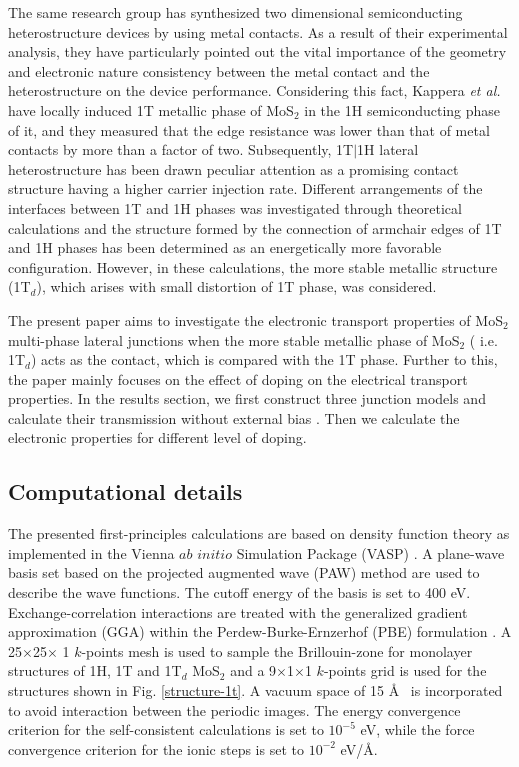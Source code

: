 The same research group has synthesized two dimensional semiconducting heterostructure devices\cite{Huang2014,Zhang2015} by using metal contacts. As a result of their experimental analysis, they have particularly pointed out the vital importance of the geometry and electronic nature consistency between the metal contact and the heterostructure on the device performance\cite{Bai2013,Eda2012}. Considering this fact, Kappera \textit{et al.}\cite{Kappera2014} have locally induced 1T metallic phase of MoS$_2$ in the 1H semiconducting phase of it, and they measured that the edge resistance was lower than that of metal contacts by more than a factor of two. Subsequently, 1T$\mid$1H lateral heterostructure has been drawn peculiar attention as a promising contact structure having a higher carrier injection rate. Different arrangements of the interfaces between 1T and 1H phases was investigated through theoretical calculations\cite{Hu2015,Sivaraman2016} and the structure formed by the connection of armchair edges of 1T and 1H phases has been determined as an energetically more favorable configuration. However, in these calculations, the more stable metallic structure (1T$_d$), which arises with small distortion of 1T phase, was considered.

The present paper aims to investigate the electronic transport properties of MoS$_2$ multi-phase lateral junctions when the more stable metallic phase of MoS$_2$ ( i.e. 1T$_d$) acts as the contact, which is compared with the 1T phase. Further to this, the paper mainly focuses on the effect of doping on the electrical transport properties. In the results section, we first construct three junction models and calculate their transmission without external bias . Then we calculate the electronic properties for different level of doping.



\subsection{Computational details}
The presented first-principles calculations are based on density function theory as implemented in the Vienna $ab$ $initio$ Simulation Package (VASP) \cite{VASP1,VASP2,VASP3,VASP4}. A plane-wave basis set based on the projected augmented wave (PAW) method \cite{PAW1,PAW2} are used to describe the wave functions. The cutoff energy of the basis is set to 400 eV. Exchange-correlation interactions are treated with the generalized gradient approximation (GGA) within the Perdew-Burke-Ernzerhof (PBE) formulation \cite{GGA-PBE1,GGA-PBE2}. A 25$\times$25$\times$ 1 $k$-points mesh is used to sample the Brillouin-zone for monolayer structures of 1H, 1T and 1T$_d$ MoS$_2$ and a 9$\times$1$\times$1 $k$-points grid is used for the structures shown in Fig. \ref{structure-1t}. A vacuum space of 15 \AA~ is incorporated to avoid interaction between the periodic images. The energy convergence criterion for the self-consistent calculations is set to $10^{-5}$ eV, while the force convergence criterion for the ionic steps is set to $10^{-2}$ eV/\AA.

